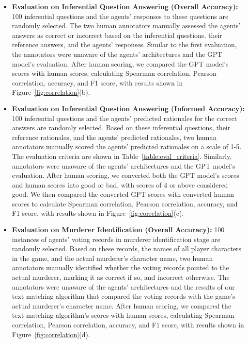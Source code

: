 \documentclass[11pt]{article}
\begin{document}
{\begin{itemize}
    \item \textbf{Evaluation on Inferential Question Answering (Overall Accuracy):} 100 inferential questions and the agents' responses to these questions are randomly selected. The two human annotators manually assessed the agents' answers as correct or incorrect based on the inferential questions, their reference answers, and the agents' responses. Similar to the first evaluation, the annotators were unaware of the agents' architectures and the GPT model's evaluation. After human scoring, we compared the GPT model's scores with human scores, calculating Spearman correlation, Pearson correlation, accuracy, and F1 score, with results shown in Figure~\ref{fig:correlation}(b).

    \item \textbf{Evaluation on Inferential Question Answering (Informed Accuracy):} 100 inferential questions and the agents' predicted rationales for the correct answers are randomly selected. Based on these inferential questions, their reference rationales, and the agents' predicted rationales, two human annotators manually scored the agents' predicted rationales on a scale of 1-5. The evaluation criteria are shown in Table~\ref{table:eval_criteria}. Similarly, annotators were unaware of the agents' architectures and the GPT model's evaluation. After human scoring, we converted both the GPT model's scores and human scores into good or bad, with scores of 4 or above considered good. We then compared the converted GPT scores with converted human scores to calculate Spearman correlation, Pearson correlation, accuracy, and F1 score, with results shown in Figure~\ref{fig:correlation}(c).

    \item \textbf{Evaluation on Murderer Identification (Overall Accuracy):} 100 instances of agents' voting records in murderer identification stage are randomly selected. Based on these records, the names of all player characters in the game, and the actual murderer's character name, two human annotators manually identified whether the voting records pointed to the actual murderer, marking it as correct if so, and incorrect otherwise. The annotators were unaware of the agents' architectures and the results of our text matching algorithm that compared the voting records with the game's actual murderer's character name. After human scoring, we compared the text matching algorithm's scores with human scores, calculating Spearman correlation, Pearson correlation, accuracy, and F1 score, with results shown in Figure~\ref{fig:correlation}(d).
\end{itemize}

}
\end{document}
